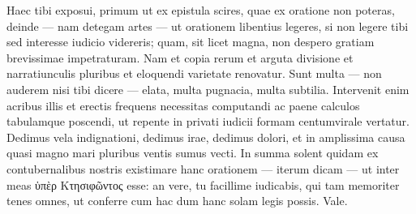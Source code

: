 Haec tibi exposui, primum ut ex epistula scires, quae ex oratione non poteras, deinde — nam detegam artes — ut orationem libentius legeres, si non legere tibi sed interesse iudicio videreris; quam, sit licet magna, non despero gratiam brevissimae impetraturam. Nam et copia rerum et arguta divisione et narratiunculis pluribus et eloquendi varietate renovatur. Sunt multa — non auderem nisi tibi dicere — elata, multa pugnacia, multa subtilia. Intervenit enim acribus illis et erectis frequens necessitas computandi ac paene calculos tabulamque poscendi, ut repente in privati iudicii formam centumvirale vertatur. Dedimus vela indignationi, dedimus irae, dedimus dolori, et in amplissima causa quasi magno mari pluribus ventis sumus vecti. In summa solent quidam ex contubernalibus nostris existimare hanc orationem — iterum dicam — ut inter meas  ὑπὲρ Κτησιφῶντος esse: an vere, tu facillime iudicabis, qui tam memoriter tenes omnes, ut conferre cum hac dum hanc solam legis possis. Vale.


